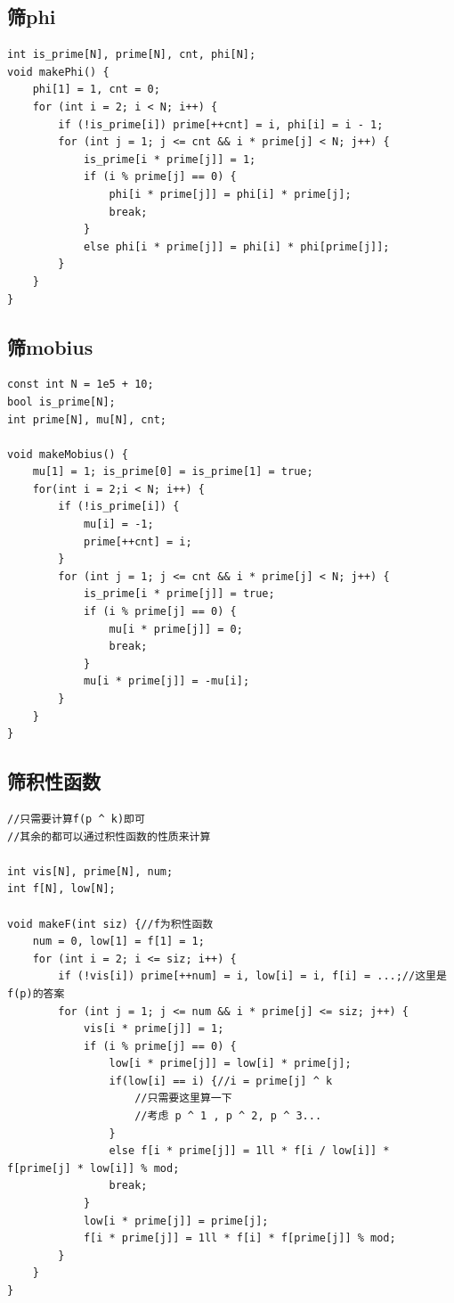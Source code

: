 \documentclass[twoside]{article}
\begin{document}
\subsection{筛phi}
\begin{lstlisting}
int is_prime[N], prime[N], cnt, phi[N];
void makePhi() {
    phi[1] = 1, cnt = 0;
    for (int i = 2; i < N; i++) {
        if (!is_prime[i]) prime[++cnt] = i, phi[i] = i - 1;
        for (int j = 1; j <= cnt && i * prime[j] < N; j++) {
            is_prime[i * prime[j]] = 1;
            if (i % prime[j] == 0) {
                phi[i * prime[j]] = phi[i] * prime[j];
                break;
            }
            else phi[i * prime[j]] = phi[i] * phi[prime[j]];
        }
    }
}
\end{lstlisting}
\subsection{筛mobius}
\begin{lstlisting}
const int N = 1e5 + 10;
bool is_prime[N];
int prime[N], mu[N], cnt;

void makeMobius() {
    mu[1] = 1; is_prime[0] = is_prime[1] = true;
    for(int i = 2;i < N; i++) {
        if (!is_prime[i]) {
            mu[i] = -1;
            prime[++cnt] = i;
        }
        for (int j = 1; j <= cnt && i * prime[j] < N; j++) {
            is_prime[i * prime[j]] = true;
            if (i % prime[j] == 0) {
                mu[i * prime[j]] = 0;
                break;
            }
            mu[i * prime[j]] = -mu[i];
        }
    }
}
\end{lstlisting}
\subsection{筛积性函数}
\begin{lstlisting}
//只需要计算f(p ^ k)即可
//其余的都可以通过积性函数的性质来计算

int vis[N], prime[N], num;
int f[N], low[N];

void makeF(int siz) {//f为积性函数
    num = 0, low[1] = f[1] = 1;
    for (int i = 2; i <= siz; i++) {
        if (!vis[i]) prime[++num] = i, low[i] = i, f[i] = ...;//这里是f(p)的答案
        for (int j = 1; j <= num && i * prime[j] <= siz; j++) {
            vis[i * prime[j]] = 1;
            if (i % prime[j] == 0) {
                low[i * prime[j]] = low[i] * prime[j];
                if(low[i] == i) {//i = prime[j] ^ k
                    //只需要这里算一下
                    //考虑 p ^ 1 , p ^ 2, p ^ 3...
                }
                else f[i * prime[j]] = 1ll * f[i / low[i]] * f[prime[j] * low[i]] % mod;
                break;
            }
            low[i * prime[j]] = prime[j];
            f[i * prime[j]] = 1ll * f[i] * f[prime[j]] % mod;
        }
    }
}

\end{lstlisting}
\end{document}
